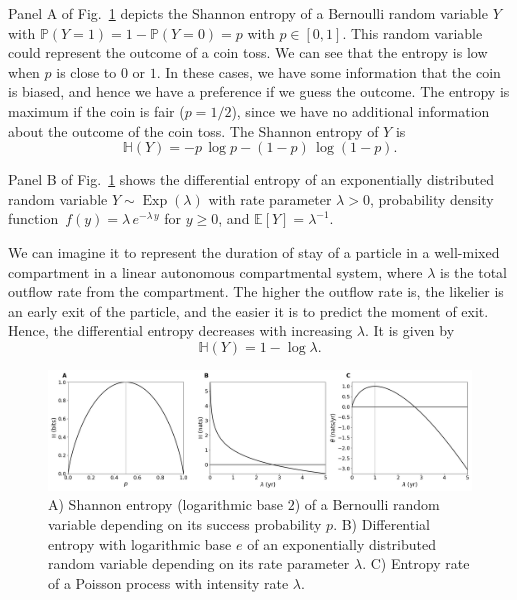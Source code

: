\documentclass[smallextended]{svjour3}
\renewcommand{\P}{\mathbb{P}}
\newcommand{\E}{\mathbb{E}}
\renewcommand{\H}{\mathbb{H}}
\newcommand{\Exp}{\operatorname{Exp}}
\newcommand{\pdf}{probability density function}
\begin{document}
Panel A of Fig.~\ref{fig:simple_entropy} depicts the Shannon entropy of a Bernoulli random variable $Y$ with $\P(Y=1)=1-\P(Y=0)=p$ with $p\in[0,1]$.
This random variable could represent the outcome of a coin toss.
We can see that the entropy is low when $p$ is close to $0$ or $1$.
In these cases, we have some information that the coin is biased, and hence we have a preference if we guess the outcome.
The entropy is maximum if the coin is fair ($p=1/2$), since we have no additional information about the outcome of the coin toss.
The Shannon entropy of $Y$ is
\begin{equation*}
	\H(Y) = -p\,\log p - (1-p)\,\log(1-p).
\end{equation*}

Panel B of Fig.~\ref{fig:simple_entropy} shows the differential entropy of an exponentially distributed random variable $Y\sim\Exp(\lambda)$ with rate parameter $\lambda>0$, \pdf\ $f(y) = \lambda\,e^{-\lambda\,y}$ for $y\geq0$, and $\E\left[Y\right]=\lambda^{-1}$.

We can imagine it to represent the duration of stay of a particle in a well-mixed compartment in a linear autonomous compartmental system, where $\lambda$ is the total outflow rate from the compartment.
The higher the outflow rate is, the likelier is an early exit of the particle, and the easier it is to predict the moment of exit.
Hence, the differential entropy decreases with increasing $\lambda$.
It is given by
\begin{equation*}
	\H(Y) = 1-\log\lambda.
\end{equation*}

\begin{figure}[htbp]
  \vspace{-0.6cm}
  \centering
  \includegraphics[width=1.0\linewidth]{figs/simple_entropy_py.png}
  \caption{A) Shannon entropy (logarithmic base $2$) of a Bernoulli random variable depending on its success probability $p$.
  B) Differential entropy with logarithmic base $e$ of an exponentially distributed random variable depending on its rate parameter $\lambda$.
  C) Entropy rate of a Poisson process with intensity rate $\lambda$.}
  \label{fig:simple_entropy}
\end{figure}
\end{document}
